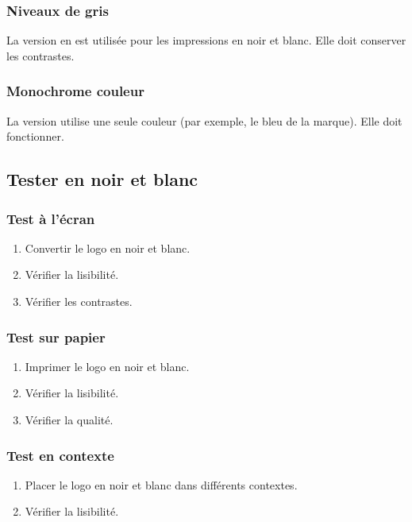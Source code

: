 \subsubsection{Niveaux de gris}

La version en  est utilisée pour les impressions en noir et blanc. Elle doit conserver les contrastes.

\subsubsection{Monochrome couleur}

La version  utilise une seule couleur (par exemple, le bleu de la marque). Elle doit fonctionner.

\subsection{Tester en noir et blanc}

\subsubsection{Test à l'écran}

\begin{enumerate}
    \item Convertir le logo en noir et blanc.
    \item Vérifier la lisibilité.
    \item Vérifier les contrastes.
\end{enumerate}

\subsubsection{Test sur papier}

\begin{enumerate}
    \item Imprimer le logo en noir et blanc.
    \item Vérifier la lisibilité.
    \item Vérifier la qualité.
\end{enumerate}

\subsubsection{Test en contexte}

\begin{enumerate}
    \item Placer le logo en noir et blanc dans différents contextes.
    \item Vérifier la lisibilité.
\end{enumerate}

